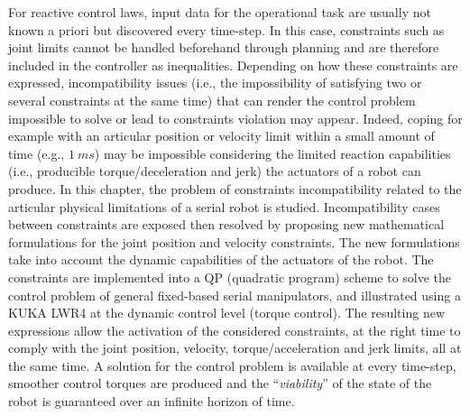 \begin{synopsis}
For reactive control laws, input data for the operational task are usually not known a priori but discovered every time-step. In this case, constraints such as joint limits cannot be handled beforehand through planning and are therefore included in the controller as inequalities. Depending on how these constraints are expressed, incompatibility issues (i.e., the impossibility of satisfying two or several constraints at the same time) that can render the control problem impossible to solve or lead to constraints violation may appear. Indeed, coping for example with an articular position or velocity limit within a small amount of time (e.g., $1~ms$) may be impossible considering the limited reaction capabilities (i.e., producible torque/deceleration and jerk) the actuators of a robot can produce. In this chapter, the problem of constraints incompatibility related to the articular physical limitations of a serial robot is studied. Incompatibility cases between constraints are exposed then resolved by proposing new mathematical formulations for the joint position and velocity constraints. The new formulations take into account the dynamic capabilities of the actuators of the robot. The constraints are implemented into a QP (quadratic program) scheme to solve the control problem of general fixed-based serial manipulators, and illustrated using a KUKA LWR4 at the dynamic control level (torque control). The resulting new expressions allow the activation of the considered constraints, at the right time to comply with the joint position, velocity, torque/acceleration and jerk limits, all at the same time. A solution for the control problem is available at every time-step, smoother control torques are produced and the ``\textit{viability}'' of the state of the robot is guaranteed over an infinite horizon of time.

\end{synopsis}
